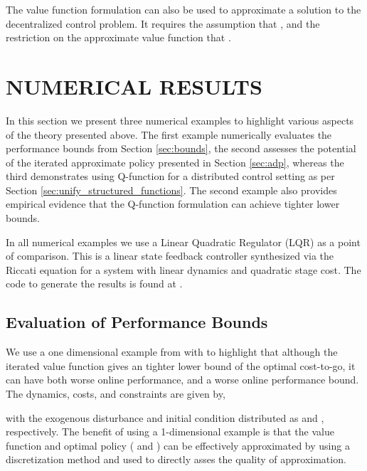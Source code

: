 \documentclass[journal]{IEEEtran}
\newcommand{\textQ}{Q}
\begin{document}
The value function formulation can also be used to approximate a solution to the decentralized control problem. It requires the assumption that , and the restriction on the approximate value function that . 








\section{NUMERICAL RESULTS} \label{sec:numerical}

In this section we present three numerical examples to highlight various aspects of the theory presented above. The first example numerically evaluates the performance bounds from Section \ref{sec:bounds}, the second assesses the potential of the iterated approximate policy presented in Section \ref{sec:adp}, whereas the third demonstrates using \textQ-function for a distributed control setting as per Section \ref{sec:unify_structured_functions}. The second example also provides empirical evidence that the \textQ-function formulation can achieve tighter lower bounds.


In all numerical examples we use a Linear Quadratic Regulator (LQR) as a point of comparison. This is a linear state feedback controller synthesized via the Riccati equation for a system with linear dynamics and quadratic stage cost.
The code to generate the results is found at \cite{beuchat_2017_ADPToolbox}.




\subsection{Evaluation of Performance Bounds} \label{sec:numerical_1d}

We use a one dimensional example from \cite{boyd_iteratedBellman} with  to highlight that although the iterated value function gives an tighter lower bound of the optimal cost-to-go, it can have both worse online performance, and a worse online performance bound. The dynamics, costs, and constraints are given by,
	
with the exogenous disturbance and initial condition distributed as  and , respectively. The benefit of using a 1-dimensional example is that the value function and optimal policy ( and ) can be effectively approximated by using a discretization method and used to directly asses the quality of approximation.
\end{document}
